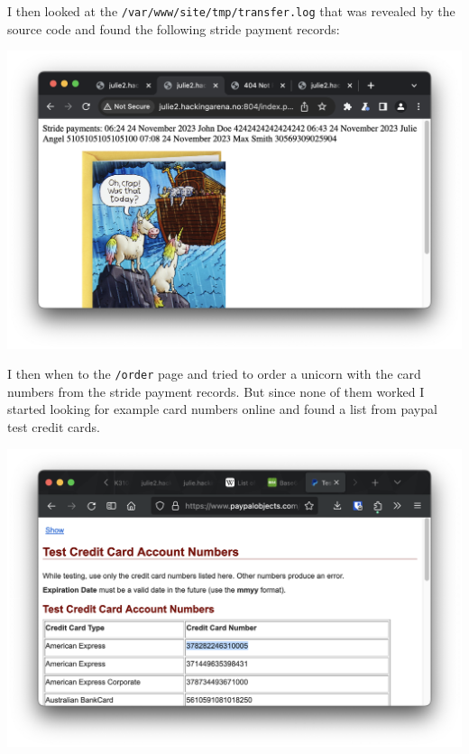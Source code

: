 I then looked at the \texttt{/var/www/site/tmp/transfer.log} that was revealed by the source code and found the following stride payment records:

\begin{center}
    \includegraphics[width=14cm]{img/Web hacking/Order a Unicorn/Screenshot 2023-11-24 at 12.55.13.png}
\end{center}

I then when to the \texttt{/order} page and tried to order a unicorn with the card numbers from the stride payment records. But since none of them worked I started looking for example card numbers online and found a list from paypal test credit cards.

\begin{center}
    \includegraphics[width=15cm]{img/Web hacking/Order a Unicorn/Screenshot 2023-11-24 at 12.55.43.png}
\end{center}


